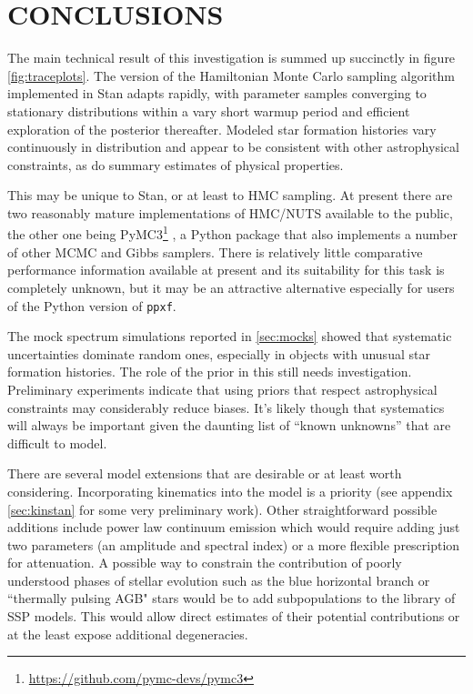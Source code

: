 \documentclass[modern]{aastex62}
\begin{document}
\section{CONCLUSIONS}
\label{sec:end}

The main technical result of this investigation is summed up succinctly in figure \ref{fig:traceplots}. The version of the Hamiltonian Monte Carlo sampling algorithm implemented in Stan adapts rapidly, with parameter samples converging to stationary distributions within a vary short warmup period and efficient exploration of the posterior thereafter. Modeled star formation histories vary continuously in distribution and appear to be consistent with other astrophysical constraints, as do summary estimates of physical properties.

This may be unique to Stan, or at least to HMC sampling. At present there are two reasonably mature implementations of HMC/NUTS available to the public, the other one being PyMC3\footnote{\url{https://github.com/pymc-devs/pymc3}} \citep{10.7717/peerj-cs.55}, a Python package that also implements a number of other MCMC and Gibbs samplers. There is relatively little comparative performance information available at present and its suitability for this task is completely unknown, but it may be an attractive alternative especially for users of the Python version of \texttt{ppxf}.

The mock spectrum simulations reported in \ref{sec:mocks} showed that systematic uncertainties dominate random ones, especially in objects with unusual star formation histories. The role of the prior in this still needs investigation. Preliminary experiments indicate that using priors that respect astrophysical constraints may considerably reduce biases. It's likely though that systematics will always be important given the daunting list of ``known unknowns'' \citep{2013ARA&A..51..393C} that are difficult to model.

There are several model extensions that are desirable or at least worth considering. Incorporating kinematics into the model is a priority (see appendix \ref{sec:kinstan} for some very preliminary work). Other straightforward possible additions include power law continuum emission which would require adding just two parameters (an amplitude and spectral index) or a more flexible prescription for attenuation. A possible way to constrain the contribution of poorly understood phases of stellar evolution such as the blue horizontal branch or ``thermally pulsing AGB" \citep[TP-AGB,][]{2005MNRAS.362..799M} stars would be to add subpopulations to the library of SSP models. This would allow direct estimates of their potential contributions or at the least expose additional degeneracies.
\end{document}
